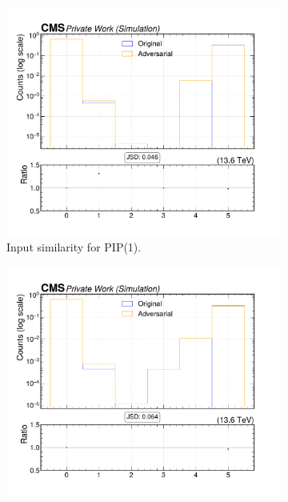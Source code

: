 \begin{figure}[htbp]
  \centering
  \begin{subfigure}[t]{0.32\textwidth}
    \includegraphics[width=\linewidth]{media/output/features/compare/intprob_1/cmp_cpf_arr_Cpfcan_quality.pdf}
    \caption{Input similarity for PIP(1).}
  \end{subfigure}\hfill
  \begin{subfigure}[t]{0.32\textwidth}
    \includegraphics[width=\linewidth]{media/output/features/compare/intprob_2/cmp_cpf_arr_Cpfcan_quality.pdf}

\end{subfigure}
\end{figure}
